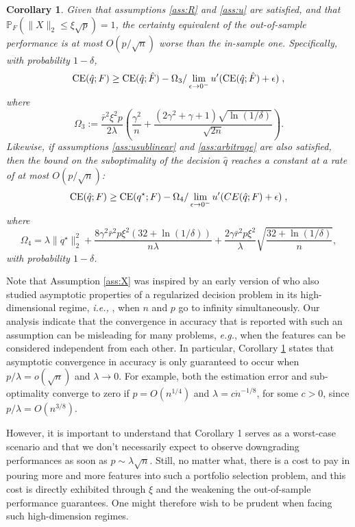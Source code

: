 \documentclass[]{interact}
\theoremstyle{plain}%
\theoremstyle{definition}
\theoremstyle{remark}
\def\Prob{{\mathbb P}}
\newcommand{\ie}{{\it i.e., }}
\newcommand{\eg}{\textit{e.g.}}
\newcommand{\0}{\V{0}}
\newcommand{\1}{\V{1}}
\newcommand{\modified}[1]{{\color{blue} #1}}
\def\CE{\mathop{\rm CE}}
\theoremstyle{plain}
\newtheorem{coro}{Corollary}
\theoremstyle{definition}
\begin{document}
\begin{coro}\label{coro:outsampleBoundBigData}
  Given that assumptions \ref{ass:R} and \ref{ass:u} are satisfied, and that
  $\Prob_F(\|X\|_2\leq \xi\sqrt{p})=1$, the certainty equivalent of the out-of-sample
  performance is at most $O(p/\sqrt{n})$ worse than the in-sample one. Specifically, with
  probability $1-\delta$,
  \[
    \CE(\qhat;\F) \geq \CE(\qhat;\Fhat) - \Omega_3/
    \lim_{\epsilon\to0^-}u'(\CE(\qhat;\Fhat)+\epsilon)\;,
  \]
  where
  \[
    \Omega_3 := \frac{\bar{r}^2\xi^2p}{2\lambda} \left(\frac{\gamma^2}{n} +
      \frac{(2\gamma^2 + \gamma + 1)\sqrt{\ln(1/\delta)}}{\sqrt{2n}}\right).
  \]
  Likewise, if assumptions \ref{ass:usublinear} and \ref{ass:arbitrage} are also satisfied, then the bound on the suboptimality of the decision $\hat q$ reaches a constant  at a rate of at most $O(p/\sqrt{n})$:
  \[
    \CE(\hat q;F) \geq \CE(q^\star;F) - \Omega_4/\lim_{\epsilon\to0^{-}}u'(CE(\hat q;F)+\epsilon)\;,
  \]
  where
  \[
    \Omega_4 = \lambda\|q^\star\|_2^2 +\frac{8\gamma^2\bar{r}^2 p\xi^2(32+\ln(1/\delta))}{n\lambda}
    +\frac{2\gamma\bar{r}^2 p\xi^2}{\lambda}\sqrt{\frac{32+\ln(1/\delta)}{n}},
  \]
  with probability $1-\delta$.
\end{coro}

Note that Assumption \ref{ass:X} was inspired by an early version of \cite{rudin2015big} who also studied
asymptotic properties of a regularized decision problem in its high-dimensional regime, \ie, when
$n$ and $p$ go to infinity simultaneously. Our analysis indicate that the convergence in
accuracy that is reported with such an assumption can be misleading for many
problems, \eg, when the features can be considered independent from each other.  In
particular, Corollary \ref{coro:outsampleBoundBigData} states that asymptotic convergence 
in accuracy is only guaranteed to occur when $p/\lambda=o(\sqrt{n})$ and $\lambda\rightarrow 0$. \modified{For example, both the estimation error and sub-optimality  converge to zero if $p=O(n^{1/4})$ and $\lambda=c\dot n^{-1/8}$, for some $c>0$, since $p/\lambda=O(n^{3/8})$.}

However, it is important to understand that Corollary 1 serves as a worst-case scenario
and that we don't necessarily expect to observe downgrading performances as soon as
$p \sim \lambda\sqrt{n}$. Still, no matter what, there is a cost to pay in pouring more and more
features into such a portfolio selection problem, and this cost is directly exhibited
through $\xi$ and the weakening the out-of-sample performance guarantees. One might therefore wish to be
prudent when facing such high-dimension regimes.
\end{document}
